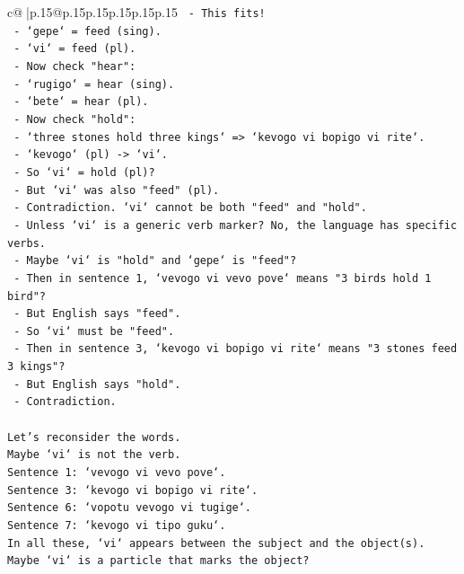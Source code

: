 \documentclass{article}
\begin{document}
{\begin{supertabular}{c@{$\;$}|p{.15\linewidth}@{}p{.15\linewidth}p{.15\linewidth}p{.15\linewidth}p{.15\linewidth}p{.15\linewidth}}
{{{\texttt{  {-} This fits!} \\
\texttt{    {-} `gepe` = feed (sing).} \\
\texttt{    {-} `vi` = feed (pl).} \\
\texttt{  {-} Now check "hear":} \\
\texttt{    {-} `rugigo` = hear (sing).} \\
\texttt{    {-} `bete` = hear (pl).} \\
\texttt{  {-} Now check "hold":} \\
\texttt{    {-} `three stones hold three kings` => `kevogo vi bopigo vi rite`.} \\
\texttt{    {-} `kevogo` (pl) {-}> `vi`.} \\
\texttt{    {-} So `vi` = hold (pl)?} \\
\texttt{    {-} But `vi` was also "feed" (pl).} \\
\texttt{    {-} Contradiction. `vi` cannot be both "feed" and "hold".} \\
\texttt{    {-} Unless `vi` is a generic verb marker? No, the language has specific verbs.} \\
\texttt{    {-} Maybe `vi` is "hold" and `gepe` is "feed"?} \\
\texttt{    {-} Then in sentence 1, `vevogo vi vevo pove` means "3 birds hold 1 bird"?} \\
\texttt{    {-} But English says "feed".} \\
\texttt{    {-} So `vi` must be "feed".} \\
\texttt{    {-} Then in sentence 3, `kevogo vi bopigo vi rite` means "3 stones feed 3 kings"?} \\
\texttt{    {-} But English says "hold".} \\
\texttt{    {-} Contradiction.} \\
\\ 
\texttt{Let's reconsider the words.} \\
\texttt{Maybe `vi` is not the verb.} \\
\texttt{Sentence 1: `vevogo vi vevo pove`.} \\
\texttt{Sentence 3: `kevogo vi bopigo vi rite`.} \\
\texttt{Sentence 6: `vopotu vevogo vi tugige`.} \\
\texttt{Sentence 7: `kevogo vi tipo guku`.} \\
\texttt{In all these, `vi` appears between the subject and the object(s).} \\
\texttt{Maybe `vi` is a particle that marks the object?} \\
}}}
\end{supertabular}}
\end{document}
